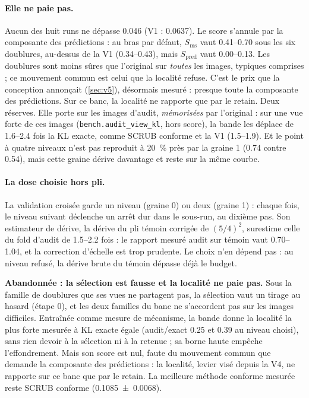 \documentclass[11pt,a4paper]{article}
\newcommand{\code}[1]{\texttt{#1}}
\begin{document}
\paragraph{Elle ne paie pas.} Aucun des huit runs ne dépasse \num{0.046} (V1 : \num{0.0637}). Le score
s'annule par la composante des prédictions : au bras par défaut, $S_{\text{ms}}$ vaut
\numrange{0.41}{0.70} sous les six doublures, au-dessus de la V1 (\numrange{0.34}{0.43}), mais
$S_{\text{pred}}$ vaut \numrange{0.00}{0.13}. Les doublures sont moins sûres que l'original sur
\emph{toutes} les images, typiques comprises ; ce mouvement commun est celui que la localité refuse.
C'est le prix que la conception annonçait (\cref{sec:v5}), désormais mesuré : presque toute la
composante des prédictions. Sur ce banc, la localité ne rapporte que par le retain. Deux réserves.
Elle porte sur les images d'audit, \emph{mémorisées} par l'original : sur une vue forte de ces images
(\code{bench.audit\_view\_kl}, hors score), la bande les déplace de \numrange{1.6}{2.4} fois la KL
exacte, comme SCRUB conforme et la V1 (\numrange{1.5}{1.9}). Et le point à quatre niveaux n'est pas
reproduit à \SI{20}{\percent} près par la graine 1 (\num{0.74} contre \num{0.54}), mais cette graine
dérive davantage et reste sur la même courbe.

\paragraph{La dose choisie hors pli.} La validation croisée garde un niveau (graine 0) ou deux
(graine 1) : chaque fois, le niveau suivant déclenche un arrêt dur dans le sous-run, au dixième pas. Son
estimateur de dérive, la dérive du pli témoin corrigée de $(5/4)^2$, surestime celle du fold d'audit de
\numrange{1.5}{2.2} fois : le rapport mesuré audit sur témoin vaut \numrange{0.70}{1.04}, et la
correction d'échelle est trop prudente. Le choix n'en dépend pas : au niveau refusé, la dérive brute du
témoin dépasse déjà le budget.

\begin{retenir}
\textbf{Abandonnée : la sélection est fausse et la localité ne paie pas.} Sous la famille de doublures
que ses vues ne partagent pas, la sélection vaut un tirage au hasard (étape 0), et les deux familles
du banc ne s'accordent pas sur les images difficiles. Entraînée comme mesure de mécanisme, la bande
donne la localité la plus forte mesurée à KL exacte égale (audit/exact \num{0.25} et \num{0.39} au niveau
choisi), sans rien devoir à la sélection ni à la retenue ; sa borne haute empêche l'effondrement.
Mais son score est nul, faute du mouvement commun que demande la composante des prédictions : la
localité, levier visé depuis la V4, ne rapporte sur ce banc que par le retain. La meilleure méthode
conforme mesurée reste SCRUB conforme (\num{0.1085 +- 0.0068}).
\end{retenir}
\end{document}
